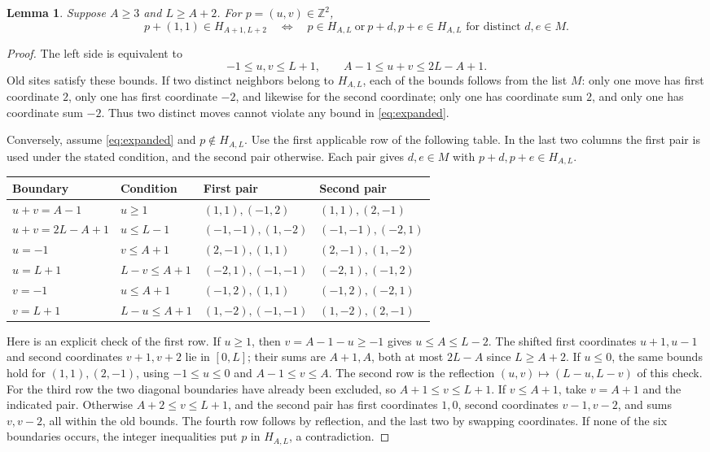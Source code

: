 \documentclass[11pt]{article}
\newtheorem{lemma}[theorem]{Lemma}
\newcommand{\Z}{\mathbb Z}
\begin{document}
\begin{lemma}\label{lem:update}
Suppose $A\geq3$ and $L\geq A+2$. For $p=(u,v)\in\Z^2$,
\[
 p+(1,1)\in H_{A+1,L+2}
 \quad\Longleftrightarrow\quad
 p\in H_{A,L}\ \text{or}\ p+d,p+e\in H_{A,L}
 \text{ for distinct }d,e\in M.
\]
\end{lemma}
\begin{proof}
The left side is equivalent to
\begin{equation}\label{eq:expanded}
 -1\leq u,v\leq L+1,\qquad A-1\leq u+v\leq2L-A+1.
\end{equation}
Old sites satisfy these bounds. If two distinct neighbors belong to
$H_{A,L}$, each of the bounds follows from the list $M$: only one move
has first coordinate $2$, only one has first coordinate $-2$, and likewise
for the second coordinate; only one has coordinate sum $2$, and only one
has coordinate sum $-2$. Thus two distinct moves cannot violate any bound
in \eqref{eq:expanded}.

Conversely, assume \eqref{eq:expanded} and $p\notin H_{A,L}$.
Use the first applicable row of the following table. In the last two
columns the first pair is used under the stated condition, and the second
pair otherwise. Each pair gives $d,e\in M$ with $p+d,p+e\in H_{A,L}$.
\begin{center}\small
\begin{tabular}{@{}llll@{}}
\toprule
Boundary & Condition & First pair & Second pair\\
\midrule
$u+v=A-1$ & $u\geq1$ & $(1,1),(-1,2)$ & $(1,1),(2,-1)$\\
$u+v=2L-A+1$ & $u\leq L-1$ & $(-1,-1),(1,-2)$ & $(-1,-1),(-2,1)$\\
$u=-1$ & $v\leq A+1$ & $(2,-1),(1,1)$ & $(2,-1),(1,-2)$\\
$u=L+1$ & $L-v\leq A+1$ & $(-2,1),(-1,-1)$ & $(-2,1),(-1,2)$\\
$v=-1$ & $u\leq A+1$ & $(-1,2),(1,1)$ & $(-1,2),(-2,1)$\\
$v=L+1$ & $L-u\leq A+1$ & $(1,-2),(-1,-1)$ & $(1,-2),(2,-1)$\\
\bottomrule
\end{tabular}
\end{center}
Here is an explicit check of the first row. If $u\geq1$, then
$v=A-1-u\geq-1$ gives $u\leq A\leq L-2$. The shifted first coordinates
$u+1,u-1$ and second coordinates $v+1,v+2$ lie in $[0,L]$;
their sums are $A+1,A$, both at most $2L-A$ since $L\geq A+2$.
If $u\leq0$, the same bounds hold for $(1,1),(2,-1)$, using
$-1\leq u\leq0$ and $A-1\leq v\leq A$.
The second row is the reflection $(u,v)\mapsto(L-u,L-v)$ of this check.
For the third row the two diagonal boundaries have already been excluded,
so $A+1\leq v\leq L+1$. If $v\leq A+1$, take $v=A+1$ and the indicated
pair. Otherwise $A+2\leq v\leq L+1$, and the second pair has first
coordinates $1,0$, second coordinates $v-1,v-2$, and sums $v,v-2$,
all within the old bounds. The fourth row follows by reflection, and
the last two by swapping coordinates. If none of the six boundaries occurs,
the integer inequalities put $p$ in $H_{A,L}$, a contradiction.
\end{proof}
\end{document}
